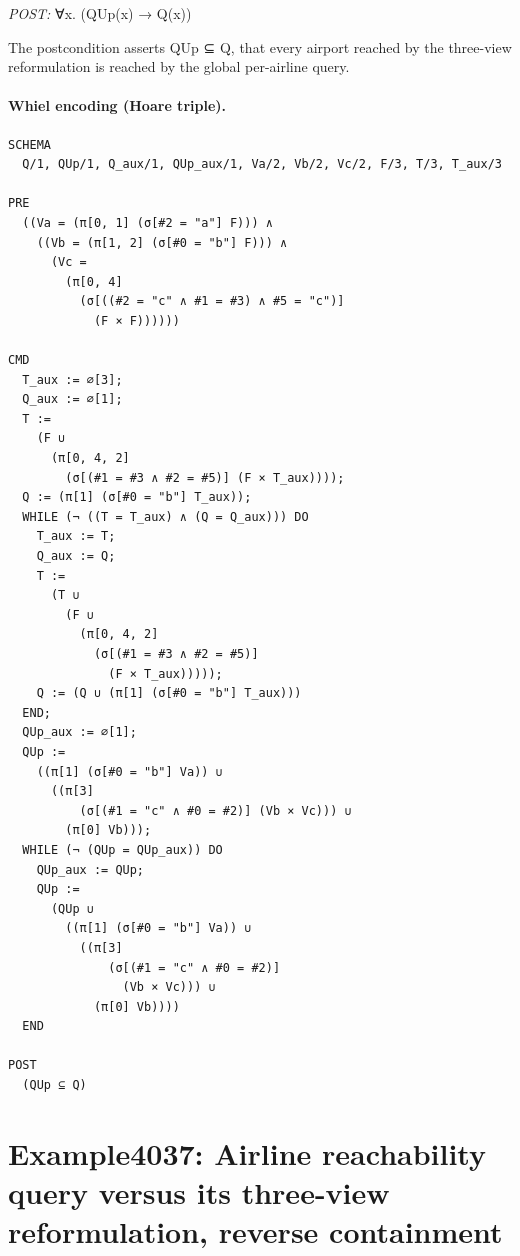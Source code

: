 \documentclass[10pt]{article}
\begin{document}
\textit{POST:} ∀x. (QUp(x) → Q(x))\par The postcondition asserts QUp ⊆ Q, that every airport reached by the three-view reformulation is reached by the global per-airline query.

\paragraph{Whiel encoding (Hoare triple).}

\begin{Verbatim}[fontsize=\tiny,breaklines=true,breakanywhere=true,frame=single,framesep=1.5mm]
SCHEMA
  Q/1, QUp/1, Q_aux/1, QUp_aux/1, Va/2, Vb/2, Vc/2, F/3, T/3, T_aux/3

PRE
  ((Va = (π[0, 1] (σ[#2 = "a"] F))) ∧
    ((Vb = (π[1, 2] (σ[#0 = "b"] F))) ∧
      (Vc =
        (π[0, 4]
          (σ[((#2 = "c" ∧ #1 = #3) ∧ #5 = "c")]
            (F × F))))))

CMD
  T_aux := ∅[3];
  Q_aux := ∅[1];
  T :=
    (F ∪
      (π[0, 4, 2]
        (σ[(#1 = #3 ∧ #2 = #5)] (F × T_aux))));
  Q := (π[1] (σ[#0 = "b"] T_aux));
  WHILE (¬ ((T = T_aux) ∧ (Q = Q_aux))) DO
    T_aux := T;
    Q_aux := Q;
    T :=
      (T ∪
        (F ∪
          (π[0, 4, 2]
            (σ[(#1 = #3 ∧ #2 = #5)]
              (F × T_aux)))));
    Q := (Q ∪ (π[1] (σ[#0 = "b"] T_aux)))
  END;
  QUp_aux := ∅[1];
  QUp :=
    ((π[1] (σ[#0 = "b"] Va)) ∪
      ((π[3]
          (σ[(#1 = "c" ∧ #0 = #2)] (Vb × Vc))) ∪
        (π[0] Vb)));
  WHILE (¬ (QUp = QUp_aux)) DO
    QUp_aux := QUp;
    QUp :=
      (QUp ∪
        ((π[1] (σ[#0 = "b"] Va)) ∪
          ((π[3]
              (σ[(#1 = "c" ∧ #0 = #2)]
                (Vb × Vc))) ∪
            (π[0] Vb))))
  END

POST
  (QUp ⊆ Q)
\end{Verbatim}

\Needspace{0.45\textheight}

\section{Example4037: Airline reachability query versus its three-view reformulation, reverse containment}\label{case:Example4037}
\end{document}
